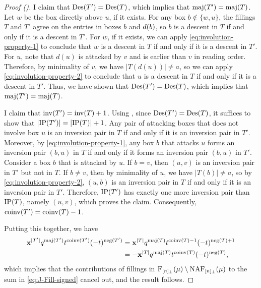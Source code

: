 \begin{proof}[Proof ({\cite[744]{HHL05}})]
	I claim that \(\Des(T') = \Des(T)\), which implies that \(\maj(T') = \maj(T)\).
	Let \(w\) be the box directly above \(u\), if it exists.
	For any box \(b \notin \{w, u\}\), the fillings \(T\) and \(T'\) agree on the entries in boxes \(b\) and \(d(b)\),
	so \(b\) is a descent in \(T\) if and only if it is a descent in \(T'\).
	For \(w\), if it exists, we can apply \eqref{eq:involution-property-1} to conclude that \(w\) is a descent in \(T\) if and only if it is a descent in \(T'\).
	For \(u\), note that \( d(u) \) is attacked by \(v\) and is earlier than \(v\) in reading order.
	Therefore, by minimality of \(v\), we have \(|T(d(u))| \neq a\), so we can apply \eqref{eq:involution-property-2} to conclude that \(u\) is a descent in \(T\) if and only if it is a descent in \(T'\).
	Thus, we have shown that \(\Des(T') = \Des(T)\), which implies that \(\maj(T') = \maj(T)\).

	I claim that \(\inv(T') = \inv(T) + 1\).
	Using , since \(\Des(T') = \Des(T)\), it suffices to show that \(\left|\operatorname{IP}(T')\right| = \left|\operatorname{IP}(T)\right| + 1\).
	Any pair of attacking boxes that does not involve box \(u\) is an inversion pair in \(T\) if and only if it is an inversion pair in \(T'\).
	Moreover, by \eqref{eq:involution-property-1}, any box \(b\) that attacks \(u\) forms an inversion pair \((b, u)\) in \(T\) if and only if it forms an inversion pair \((b, u)\) in \(T'\).
	Consider a box \(b\) that is attacked by \(u\).
	If \(b = v\), then \((u, v)\) is an inversion pair in \(T'\) but not in \(T\).
	If \(b \neq v\), then by minimality of \(u\), we have \(|T(b)| \neq a\), so by \eqref{eq:involution-property-2}, \((u, b)\) is an inversion pair in \(T\) if and only if it is an inversion pair in \(T'\).
	Therefore, \(\operatorname{IP}(T')\) has exactly one more inversion pair than \(\operatorname{IP}(T)\), namely \((u, v)\),
	which proves the claim.
	Consequently, \(\coinv(T') = \coinv(T) - 1\).

	Putting this together, we have
	\begin{align*}
		\mathbf{x}^{|T'|} q^{\maj(T')} t^{\coinv(T')} (-t)^{\operatorname{neg}(T')}
		&= \mathbf{x}^{|T|} q^{\maj(T)} t^{\coinv(T) - 1} (-t)^{\operatorname{neg}(T) + 1} \\
		&= - \mathbf{x}^{|T|} q^{\maj(T)} t^{\coinv(T)} (-t)^{\operatorname{neg}(T)},
	\end{align*}
	which implies that the contributions of fillings in \(\Fill[\interval{n}_\pm](\mu) \setminus \NAF[\interval{n}_\pm](\mu)\) to the sum in \eqref{eq:J-Fill-signed} cancel out, and the result follows.
\end{proof}

